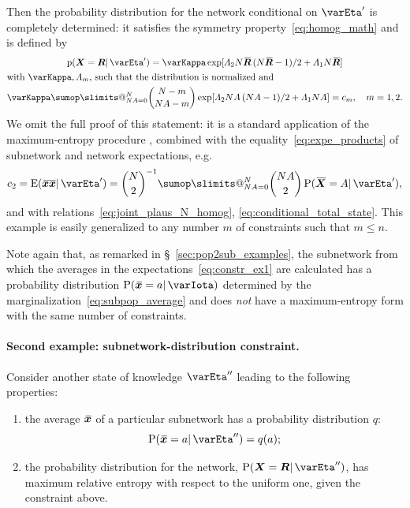 \documentclass{article}
\makeatletter
\theoremstyle{remark}
\theoremstyle{innote}
\def\sum{\DOTSI\sumop\slimits@}
\newcommand*{\citep}{\parencites}
\renewcommand*{\|}{\mathpunct{|}}%
\renewcommand{\le}{\leqslant}%
\newcommand*{\pf}{\mathrm{p}}%
\newcommand*{\p}{\mathrm{P}}%
\newcommand*{\sect}{\S}%
\newcommand*{\eg}{{e.g.}}
\newcommand*{\E}{\mathrm{E}}
\DeclarePairedDelimiter\expp{(}{)}
\newcommand*{\expe}{\E\expp}%
\theoremstyle{simple}
\newcommand*{\widebar}[1]{{\mkern1.5mu\skew{2}\overline{\mkern-1.5mu#1\mkern-1.5mu}\mkern 1.5mu}}
\newcommand*{\av}{\widebar} %
\newcommand*{\sav}{\widebar} %
\newcommand*{\yxx}{x}%
\newcommand*{\yx}{\bm{\yxx}}%
\newcommand*{\yxs}{\sav{\yx}}%
\newcommand*{\yX}{\bm{X}}%
\newcommand*{\yXf}{\av{\yX}}%
\newcommand*{\yR}{\bm{R}}%
\newcommand*{\yRf}{\av{\yR}}%
\newcommand*{\yH}{\varIota}
\newcommand*{\yHa}{\varEta'}
\newcommand*{\yHb}{\varEta''}
\newcommand*{\yL}{\varLambda}
\makeatother
\begin{document}
\medskip Then the probability distribution for the network conditional on $\yHa$
is completely determined: it satisfies the symmetry
property~\eqref{eq:homog_math} and is defined by
\begin{multline}
  \label{eq:pop_distr_maxent1}
  \pf(\yX =\yR \|\yHa) =
\varKappa\exp[\yL_2 N\yRf\,(N\yRf-1)/2 + \yL_1 N\yRf]
\\
\!\begin{aligned}[b]
&\text{with $\varKappa, \yL_m$, such that the distribution is normalized and}
\\
&\varKappa\sum_{N A=0}^N %
\binom{N-m}{N A-m}
\exp[\yL_2 N A\,(N A-1)/2 + \yL_1 N A]
= c_m, \quad m=1,2.
\end{aligned}
\end{multline}
We omit the full proof of this statement: it is a standard application of
the maximum-entropy procedure
\citep[\eg:][]{jaynes1957,jaynes1963,good1963,jaynes1967,jaynes1979b,vancampenhoutetal1981,sivia1990,fangetal1997,bretthorst2013},
combined with the equality~\eqref{eq:expe_products} of subnetwork and
network expectations, \eg
\begin{equation}
  \label{eq:exploit_eq_expects}
  c_2 = \expe{\sav{\yx\yx}\|\yHa} = 
\binom{N}{2}^{-1}
\sum_{N A=0}^N %
\binom{N A}{2} \, \p(\yXf = A\|\yHa),
\end{equation}
and with relations~\eqref{eq:joint_plaus_N_homog},
\eqref{eq:conditional_total_state}. This example is easily generalized to
any number $m$ of constraints such that  $m\le n$.

Note again that, as remarked in \sect~\ref{sec:pop2sub_examples}, the
subnetwork from which the averages in the
expectations~\eqref{eq:constr_ex1} are calculated has a probability
distribution $\p(\yxs =a \|\yH)$ determined by the
marginalization~\eqref{eq:subpop_average} and does \emph{not} have a
maximum-entropy form with the same number of constraints.


\paragraph{Second example: subnetwork-distribution constraint.}
\label{sec:maxent_fullsubpop}
Consider another state of knowledge $\yHb$ leading to the following
properties:
\begin{enumerate}%
\item the average $\yxs$ of a particular
  subnetwork has a probability distribution $q$:
  \begin{equation}
    \label{eq:constr_subpop_distr}
    \p(\yxs =a \|\yHb) = q(a);
  \end{equation}
\item the probability distribution for the network, $\p(\yX = \yR
  \|\yHb)$, has maximum relative entropy with respect to the uniform
  one, given the constraint above.
\end{enumerate}
\end{document}
